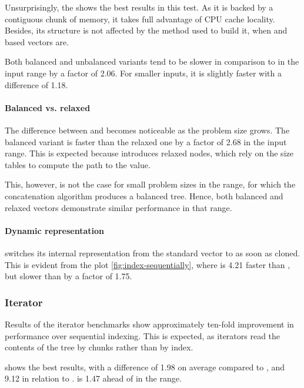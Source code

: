 Unsurprisingly, the \stdvec{} shows the best results in this test. As it is backed by a contiguous chunk of memory, it takes full advantage of CPU cache locality. Besides, its structure is not affected by the method used to build it, when \rbtree{} and \rrbtree{} based vectors are.

Both balanced and unbalanced \imrsvec{} variants tend to be slower in comparison to \rrbvec{} in the \range{[100, \mega{1}]} input range by a factor of 2.06. For smaller inputs, \rrbvec{} it is slightly faster with a difference of 1.18.

\paragraph{Balanced vs. relaxed}
The difference between \rbvec{} and \rrbvec{} becomes noticeable as the problem size grows. The balanced variant is faster than the relaxed one by a factor of 2.68 in the \range{[100, \mega{1}]} input range. This is expected because \rrbvec{} introduces relaxed nodes, which rely on the size tables to compute the path to the value.

This, however, is not the case for small problem sizes in the \range{[0, 100]} range, for which the concatenation algorithm produces a balanced tree. Hence, both balanced and relaxed vectors demonstrate similar performance in that range.

\paragraph{Dynamic representation}
\pvec{} switches its internal representation from the standard vector to \rrbvec{} as soon as cloned. This is evident from the plot \ref{fig:index-sequentially}, where \pvec{} is 4.21 faster than \rbvec{}, but slower than \stdvec{} by a factor of 1.75.

\subsubsection*{Iterator}
Results of the iterator benchmarks show approximately ten-fold improvement in performance over sequential indexing. This is expected, as iterators read the contents of the tree by chunks rather than by index.

\stdvec{} shows the best results, with a difference of 1.98 on average compared to \pvec{}, and 9.12 in relation to \rrbvec{}. \imrsvec{} is 1.47 ahead of \rrbvec{} in the \range{[20, 100]} range.

